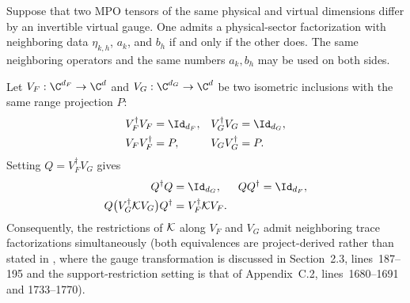 \begin{lemma}
    \label{thm:mpdo_neighboring_trace_factorization_presentation_invariant}
    \leanok
    Suppose that two MPO tensors of the same physical and virtual dimensions
    differ by an invertible virtual gauge.  One admits a physical-sector
    factorization with neighboring data $\eta_{k,h}$, $a_k$, and $b_h$ if and
    only if the other does.  The same neighboring operators and the same
    numbers $a_k,b_h$ may be used on both sides.

    Let $V_F:\C^{d_F}\to\C^d$ and
    $V_G:\C^{d_G}\to\C^d$ be two isometric inclusions with the same range
    projection $P$:
    \begin{align}
        V_F^\dagger V_F & =\Id_{d_F},
                        & V_G^\dagger V_G & =\Id_{d_G},
        \notag                                          \\
        V_FV_F^\dagger  & =P,
                        & V_GV_G^\dagger  & =P.
        \label{eq:mpdo_support_coordinate_ranges}
    \end{align}
    Setting $Q=V_F^\dagger V_G$ gives
    \begin{align}
        Q^\dagger Q & =\Id_{d_G},
                    & QQ^\dagger                & =\Id_{d_F},
        \notag                                                \\
        Q\bigl(V_G^\dagger {\cal K}V_G\bigr)Q^\dagger
                    & =V_F^\dagger {\cal K}V_F.
        \label{eq:mpdo_support_coordinate_tensor}
    \end{align}
    Consequently, the restrictions of ${\cal K}$ along $V_F$ and $V_G$
    admit neighboring trace factorizations simultaneously (both equivalences
    are project-derived rather than stated in \cite{Cirac2016MPDO_arXiv}, where
    the gauge transformation is discussed in Section~2.3, lines~187--195 and
    the support-restriction setting is that of Appendix~C.2, lines~1680--1691
    and 1733--1770).
\end{lemma}

